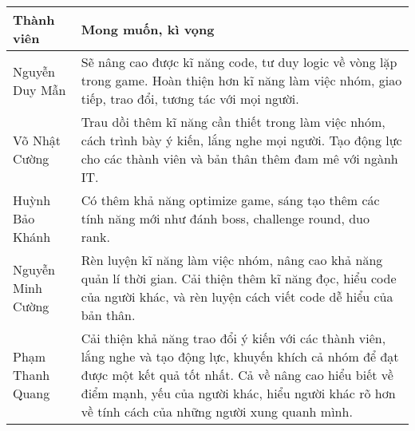 \documentclass{article}
\begin{document}
\begin{table}[h]

\centering {} \small

\begin{tabular}{|p{3cm}|p{10cm}|}

\hline

\textbf{Thành viên} & \textbf{ Mong muốn, kì vọng}\par \\ \hline

Nguyễn Duy Mẫn & Sẽ nâng cao được kĩ năng code, tư duy logic về vòng lặp trong game. Hoàn thiện hơn kĩ năng làm việc nhóm, giao tiếp, trao đổi, tương tác với mọi người.  \par\\ \hline

Võ Nhật Cường & Trau dồi thêm kĩ năng cần thiết trong làm việc nhóm, cách trình bày ý kiến, lắng nghe mọi người. Tạo động lực cho các thành viên và bản thân thêm đam mê với ngành IT.  \par\\ \hline

Huỳnh Bảo Khánh & Có thêm khả năng optimize game, sáng tạo thêm các tính năng mới như đánh boss, challenge round, duo rank. \par \\ \hline

Nguyễn Minh Cường & Rèn luyện kĩ năng làm việc nhóm, nâng cao khả năng quản lí thời gian. Cải thiện thêm kĩ năng đọc, hiểu code của người khác, và rèn luyện cách viết code dễ hiểu của bản thân. \par \\ \hline
    
Phạm Thanh Quang & Cải thiện khả năng trao đổi ý kiến với các thành viên, lắng nghe và tạo động lực, khuyến khích cả nhóm để đạt được một kết quả tốt nhất. Cả về nâng cao hiểu biết về điểm mạnh, yếu của người khác, hiểu người khác rõ hơn về tính cách của những người xung quanh mình. \par \\ \hline


\end{tabular}

\end{table}
\end{document}
